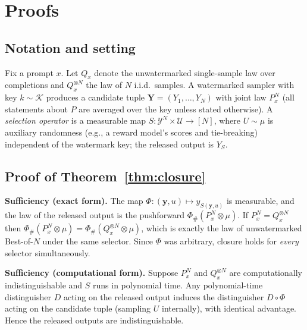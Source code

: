 \documentclass{article} %
\begin{document}



\appendix
\section{Proofs}\label{app:proofs}

\subsection{Notation and setting}
Fix a prompt $x$. Let $Q_x$ denote the unwatermarked single-sample law over
completions and $Q_x^{\otimes N}$ the law of $N$ i.i.d.\ samples. A watermarked
sampler with key $k\sim\mathcal K$ produces a candidate tuple
$\mathbf Y=(Y_1,\dots,Y_N)$ with joint law $P_x^{N}$ (all statements about $P$
are averaged over the key unless stated otherwise). A \emph{selection operator}
is a measurable map $S:\mathcal Y^{N}\times\mathcal U\to[N]$, where $U\sim\mu$ is
auxiliary randomness (e.g., a reward model's scores and tie-breaking)
independent of the watermark key; the released output is $Y_S$.

\subsection{Proof of Theorem~\ref{thm:closure}}
\textbf{Sufficiency (exact form).}
The map $\Phi:(\mathbf y,u)\mapsto y_{S(\mathbf y,u)}$ is measurable, and the law
of the released output is the pushforward $\Phi_\#(P_x^{N}\otimes\mu)$. If
$P_x^{N}=Q_x^{\otimes N}$ then
$\Phi_\#(P_x^{N}\otimes\mu)=\Phi_\#(Q_x^{\otimes N}\otimes\mu)$, which is exactly
the law of unwatermarked Best-of-$N$ under the same selector. Since $\Phi$ was
arbitrary, closure holds for \emph{every} selector simultaneously.

\textbf{Sufficiency (computational form).}
Suppose $P_x^{N}$ and $Q_x^{\otimes N}$ are computationally indistinguishable and
$S$ runs in polynomial time. Any polynomial-time distinguisher $D$ acting on the
released output induces the distinguisher $D\circ\Phi$ acting on the candidate
tuple (sampling $U$ internally), with identical advantage. Hence the released
outputs are indistinguishable.
\end{document}
